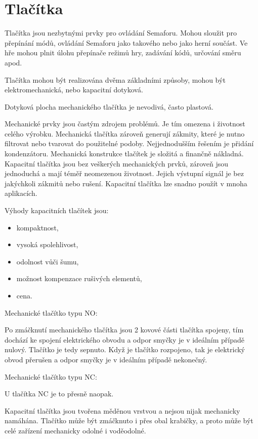 \section{Tlačítka}
Tlačítka jsou nezbytnými prvky pro ovládání Semaforu. Mohou sloužit pro přepínání módů, ovládání Semaforu jako takového nebo jako herní 
součást. Ve hře mohou plnit úlohu přepínače režimů hry, zadávání kódů, určování směru apod. 

Tlačítka mohou být realizována dvěma základními způsoby, mohou být elektromechanická, nebo kapacitní dotyková. 

Dotyková plocha mechanického tlačítka je nevodivá, často plastová. 

Mechanické prvky jsou častým zdrojem problémů. Je tím omezena i životnost celého výrobku. Mechanická tlačítka zároveň generují zákmity, které 
je nutno filtrovat nebo tvarovat do použitelné podoby. Nejjednodušším řešením je přidání kondenzátoru. Mechanická konstrukce tlačítek
je složitá a finančně nákladná. Kapacitní tlačítka jsou bez veškerých mechanických prvků, zároveň jsou jednoduchá a mají téměř neomezenou 
životnost. Jejich výstupní signál je bez jakýchkoli zákmitů nebo rušení. Kapacitní tlačítka lze snadno použít v mnoha aplikacích. 

Výhody kapacitních tlačítek jsou:
\begin{itemize}
  \item kompaktnost,
  \item vysoká spolehlivost,
  \item odolnost vůči šumu,
  \item možnost kompenzace rušivých elementů,
  \item cena. 
\end{itemize}


Mechanické tlačítko typu NO: %

Po zmáčknutí mechanického tlačítka jsou 2 kovové části tlačítka spojeny, tím dochází ke spojení elektrického obvodu 
a odpor smyčky je v ideálním případě nulový. Tlačítko je tedy sepnuto. Když je tlačítko rozpojeno, tak je 
elektrický obvod přerušen a odpor smyčky je v ideálním případě nekonečný.

Mechanické tlačítko typu NC: %

U tlačítka NC je to přesně naopak. %


Kapacitní tlačítka jsou tvořena měděnou vrstvou a nejsou nijak mechanicky namáhána. Tlačítko může být zmáčknuto i přes 
obal krabičky, a proto může být celé zařízení mechanicky odolné i voděodolné. 

